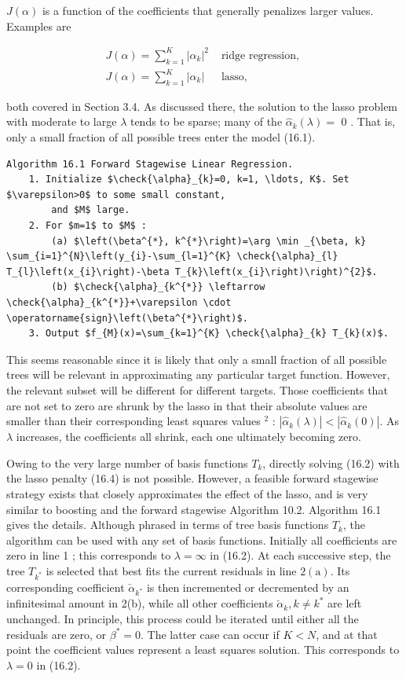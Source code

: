\documentclass[10pt]{article}
\begin{document}
$J(\alpha)$ is a function of the coefficients that generally penalizes larger values. Examples are

\[
\begin{array}{ll}
J(\alpha)=\sum_{k=1}^{K}\left|\alpha_{k}\right|^{2} & \text { ridge regression, } \\
J(\alpha)=\sum_{k=1}^{K}\left|\alpha_{k}\right| & \text { lasso, } \tag{16.4}
\end{array}
\]

both covered in Section 3.4. As discussed there, the solution to the lasso problem with moderate to large $\lambda$ tends to be sparse; many of the $\hat{\alpha}_{k}(\lambda)=$ 0 . That is, only a small fraction of all possible trees enter the model (16.1).

\begin{verbatim}
Algorithm 16.1 Forward Stagewise Linear Regression.
    1. Initialize $\check{\alpha}_{k}=0, k=1, \ldots, K$. Set $\varepsilon>0$ to some small constant,
        and $M$ large.
    2. For $m=1$ to $M$ :
        (a) $\left(\beta^{*}, k^{*}\right)=\arg \min _{\beta, k} \sum_{i=1}^{N}\left(y_{i}-\sum_{l=1}^{K} \check{\alpha}_{l} T_{l}\left(x_{i}\right)-\beta T_{k}\left(x_{i}\right)\right)^{2}$.
        (b) $\check{\alpha}_{k^{*}} \leftarrow \check{\alpha}_{k^{*}}+\varepsilon \cdot \operatorname{sign}\left(\beta^{*}\right)$.
    3. Output $f_{M}(x)=\sum_{k=1}^{K} \check{\alpha}_{k} T_{k}(x)$.
\end{verbatim}

This seems reasonable since it is likely that only a small fraction of all possible trees will be relevant in approximating any particular target function. However, the relevant subset will be different for different targets. Those coefficients that are not set to zero are shrunk by the lasso in that their absolute values are smaller than their corresponding least squares values ${ }^{2}$ : $\left|\hat{\alpha}_{k}(\lambda)\right|<\left|\hat{\alpha}_{k}(0)\right|$. As $\lambda$ increases, the coefficients all shrink, each one ultimately becoming zero.

Owing to the very large number of basis functions $T_{k}$, directly solving (16.2) with the lasso penalty (16.4) is not possible. However, a feasible forward stagewise strategy exists that closely approximates the effect of the lasso, and is very similar to boosting and the forward stagewise Algorithm 10.2. Algorithm 16.1 gives the details. Although phrased in terms of tree basis functions $T_{k}$, the algorithm can be used with any set of basis functions. Initially all coefficients are zero in line 1 ; this corresponds to $\lambda=\infty$ in (16.2). At each successive step, the tree $T_{k^{*}}$ is selected that best fits the current residuals in line $2(\mathrm{a})$. Its corresponding coefficient $\check{\alpha}_{k^{*}}$ is then incremented or decremented by an infinitesimal amount in 2(b), while all other coefficients $\check{\alpha}_{k}, k \neq k^{*}$ are left unchanged. In principle, this process could be iterated until either all the residuals are zero, or $\beta^{*}=0$. The latter case can occur if $K<N$, and at that point the coefficient values represent a least squares solution. This corresponds to $\lambda=0$ in (16.2).
\end{document}
